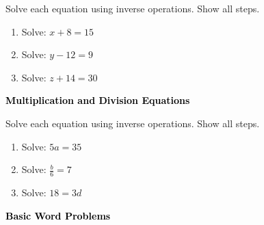 \documentclass[12pt, letterpaper, fleqn]{article}
\begin{document}
\noindent
Solve each equation using inverse operations. Show all steps.

\vspace{3mm}

\begin{enumerate}[itemsep=2.2cm, leftmargin=0.6cm]

\item Solve: $x + 8 = 15$

\vspace{2cm}

\item Solve: $y - 12 = 9$

\vspace{2cm}

\item Solve: $z + 14 = 30$

\vspace{2cm}

\end{enumerate}

\newpage

\begin{tcolorbox}[colback=black!10]
\large\textcolor{black}{\textbf{Multiplication and Division Equations}}
\end{tcolorbox}

\noindent
Solve each equation using inverse operations. Show all steps.

\vspace{3mm}

\begin{enumerate}[itemsep=2.2cm, leftmargin=0.6cm]

\item Solve: $5a = 35$

\vspace{2cm}

\item Solve: $\frac{b}{6} = 7$

\vspace{2cm}

\item Solve: $18 = 3d$

\vspace{2cm}

\end{enumerate}

\newpage

\begin{tcolorbox}[colback=black!10]
\large\textcolor{black}{\textbf{Basic Word Problems}}
\end{tcolorbox}
\end{document}
